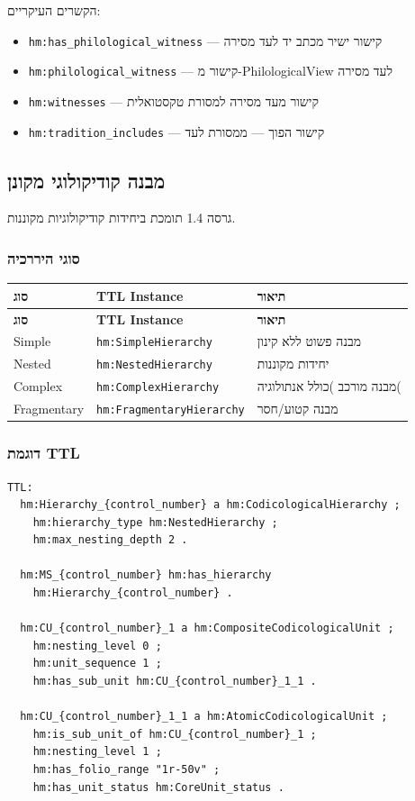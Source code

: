 \documentclass[12pt,a4paper]{article}
\newcommand{\ttlprop}[1]{\texttt{#1}}
\newcommand{\ttlclass}[1]{\texttt{#1}}
\begin{document}
הקשרים העיקריים:
\begin{itemize}
\item \ttlprop{hm:has\_philological\_witness} — קישור ישיר מכתב יד לעד מסירה
\item \ttlprop{hm:philological\_witness} — קישור מ-PhilologicalView לעד מסירה
\item \ttlprop{hm:witnesses} — קישור מעד מסירה למסורת טקסטואלית
\item \ttlprop{hm:tradition\_includes} — קישור הפוך — ממסורת לעד
\end{itemize}

\subsection{מבנה קודיקולוגי מקונן}

גרסה 1.4 תומכת ביחידות קודיקולוגיות מקוננות.

\subsubsection{סוגי היררכיה}

\begin{longtable}{|p{4cm}|L{5cm}|L{7cm}|}
\hline
\textbf{סוג} & \textbf{TTL Instance} & \textbf{תיאור} \\
\hline
\endfirsthead
\hline
\textbf{סוג} & \textbf{TTL Instance} & \textbf{תיאור} \\
\hline
\endhead
\hline
\endfoot
\textenglish{Simple} & \ttlclass{hm:SimpleHierarchy} & מבנה פשוט ללא קינון \\
\hline
\textenglish{Nested} & \ttlclass{hm:NestedHierarchy} & יחידות מקוננות \\
\hline
\textenglish{Complex} & \ttlclass{hm:ComplexHierarchy} & מבנה מורכב )כולל אנתולוגיה( \\
\hline
\textenglish{Fragmentary} & \ttlclass{hm:FragmentaryHierarchy} & מבנה קטוע/חסר \\
\hline
\end{longtable}

\subsubsection{דוגמת TTL}

\begin{LTR}
\begin{verbatim}
TTL:
  hm:Hierarchy_{control_number} a hm:CodicologicalHierarchy ;
    hm:hierarchy_type hm:NestedHierarchy ;
    hm:max_nesting_depth 2 .
  
  hm:MS_{control_number} hm:has_hierarchy 
    hm:Hierarchy_{control_number} .
  
  hm:CU_{control_number}_1 a hm:CompositeCodicologicalUnit ;
    hm:nesting_level 0 ;
    hm:unit_sequence 1 ;
    hm:has_sub_unit hm:CU_{control_number}_1_1 .
  
  hm:CU_{control_number}_1_1 a hm:AtomicCodicologicalUnit ;
    hm:is_sub_unit_of hm:CU_{control_number}_1 ;
    hm:nesting_level 1 ;
    hm:has_folio_range "1r-50v" ;
    hm:has_unit_status hm:CoreUnit_status .
\end{verbatim}
\end{LTR}
\end{document}
